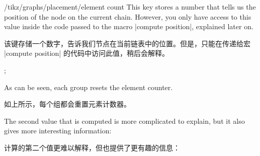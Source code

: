 %
\begin{key}{/tikz/graphs/placement/element count}
    This key stores a number that tells us the position of the node on the
    current chain. However, you only have access to this value inside the code
    passed to the macro |compute position|, explained later on.
     
    该键存储一个数字，告诉我们节点在当前链表中的位置。但是，只能在传递给宏 |compute position| 的代码中访问此值，稍后会解释。

    \begin{codeexample}[preamble={\usetikzlibrary{graphs}}]
\tikz {};
\end{codeexample}
    As can be seen, each group resets the element counter.

    如上所示，每个组都会重置元素计数器。

  \end{key}

The second value that is computed is more complicated to explain, but it also
gives more interesting information:

计算的第二个值更难以解释，但也提供了更有趣的信息：

